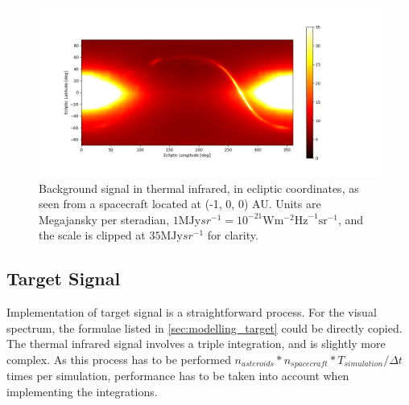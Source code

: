 \begin{figure}[htbp]
 \centering
 \includegraphics[width=1.0\textwidth]{img/background_tir_combined.png}
 \caption{Background signal in thermal infrared, in ecliptic coordinates, as seen from a spacecraft located at (-1, 0, 0) AU. Units are Megajansky per steradian, $1 \mathrm{MJy}{sr}^{-1} = 10^{-21} \mathrm{W}\mathrm{m}^{-2}\mathrm{Hz}^{-1}\mathrm{sr}^{-1}$, and the scale is clipped at $35 \mathrm{MJy}{sr}^{-1}$ for clarity.}
 \label{fig:combinedtirbackground}
\end{figure}

\subsection{Target Signal}
Implementation of target signal is a straightforward process. For the visual spectrum, the formulae listed in \autoref{sec:modelling_target} could be directly copied. The thermal infrared signal involves a triple integration, and is slightly more complex. As this process has to be performed $n_{asteroids} * n_{spacecraft} * T_{simulation} / \Delta t$ times per simulation, performance has to be taken into account when implementing the integrations. \\

